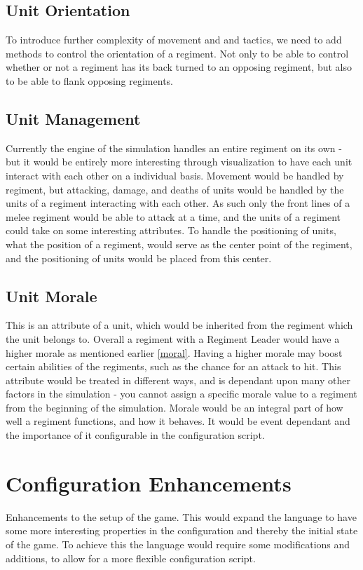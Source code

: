 \subsection{Unit Orientation}
To introduce further complexity of movement and and tactics, we need to add methods to control the orientation of a regiment. Not only to be able to control whether or not a regiment has its back turned to an opposing regiment, but also to be able to flank opposing regiments.
\subsection{Unit Management}
Currently the engine of the simulation handles an entire regiment on its own - but it would be entirely more interesting through visualization to have each unit interact with each other on a individual basis. Movement would be handled by regiment, but attacking, damage, and deaths of units would be handled by the units of a regiment interacting with each other. As such only the front lines of a melee regiment would be able to attack at a time, and the units of a regiment could take on some interesting attributes. 
To handle the positioning of units, what the position of a regiment, would serve as the center point of the regiment, and the positioning of units would be placed from this center.
\subsection{Unit Morale}
This is an attribute of a unit, which would be inherited from the regiment which the unit belongs to. Overall a regiment with a Regiment Leader would have a higher morale as mentioned earlier \ref{moral}. Having a higher morale may boost certain abilities of the regiments, such as the chance for an attack to hit. This attribute would be treated in different ways, and is dependant upon many other factors in the simulation - you cannot assign a specific morale value to a regiment from the beginning of the simulation. Morale would be an integral part of how well a regiment functions, and how it behaves. It would be event dependant and the importance of it configurable in the configuration script.
\section{Configuration Enhancements}
Enhancements to the setup of the game. This would expand the language to have some more interesting properties in the configuration and thereby the initial state of the game. To achieve this the language would require some modifications and additions, to allow for a more flexible configuration script.

